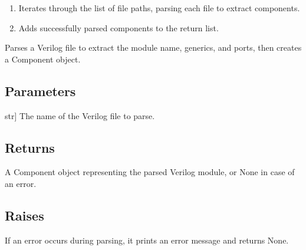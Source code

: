 \documentclass[letterpaper,10pt,english]{sphinxmanual}
\begin{document}
\begin{fulllineitems}
\begin{description}
\begin{enumerate}
\item {} 
\sphinxAtStartPar
Iterates through the list of file paths, parsing each file to extract components.

\item {} 
\sphinxAtStartPar
Adds successfully parsed components to the return list.

\end{enumerate}

\end{description}

\end{fulllineitems}


\begin{fulllineitems}
\label{\detokenize{my_parser:my_parser.parser}}
\pysigstartsignatures
{}
\pysigstopsignatures
\sphinxAtStartPar
Parses a Verilog file to extract the module name, generics, and ports, then creates a Component object.


\subsection{Parameters}
\label{\detokenize{my_parser:id1}}\begin{description}
\sphinxlineitem{file\_name}{[}str{]}
\sphinxAtStartPar
The name of the Verilog file to parse.

\end{description}


\subsection{Returns}
\label{\detokenize{my_parser:id2}}\begin{description}
\sphinxAtStartPar
A Component object representing the parsed Verilog module, or None in case of an error.

\end{description}


\subsection{Raises}
\label{\detokenize{my_parser:raises}}\begin{description}
\sphinxAtStartPar
If an error occurs during parsing, it prints an error message and returns None.


\end{description}
\end{fulllineitems}
\end{document}
